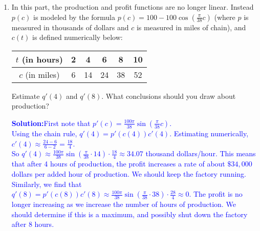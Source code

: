 \documentclass[letterpaper,11pt]{article}
\newif\ifsolutions
\newcommand{\sol}[2]{\begin{minipage}[c][#1]{\linewidth}{\textcolor{blue}{\textbf{Solution:}}\quad \textcolor{blue}{#2}}\end{minipage}}
\newcommand{\sol}[2]{\begin{minipage}[c][#1]{\linewidth}{\vfill}\end{minipage}}
\begin{document}
\begin{enumerate}
\begin{enumerate}
Meaning of $p'(c)$: \ifsolutions \textcolor{blue}{ $4000$ dollars of profit are earned per mile of chain produced.}\fi\\

$q(t) =$ \ifsolutions \textcolor{blue}{ $12000t$ dollars}\fi\\

$q'(t)=$ \ifsolutions \textcolor{blue}{ $12000$ dollars/hour}\fi\\

Meaning of $q'(t)$: \ifsolutions \textcolor{blue}{ $12000$ dollars of profit are earned per hour of production.}\fi\\

How does $q'(t)$ relate to $p'(c)$ and $c'(t)$? 

\sol{.3in}{By the chain rule $q'(t)$ = $p'(c(t))c'(t)$.  So $q'(t) = 4000$ dollars/mile  $\cdot 3$ miles/hour = 12000 dollars/hours.}
\item  In this part, the production and profit functions are no longer linear.  Instead $p(c)$ is modeled by the formula $p(c)=100-100\cos{(\frac{\pi}{38} c)}$ (where $p$ is measured in thousands of dollars and $c$ is measured in miles of chain), and $c(t)$ is defined numerically below:

\medskip
\begin{tabular}{|c|c|c|c|c|c|} \hline
$t$ (in hours) & 2 & 4  & 6  & 8 &10\\ \hline
$c$ (in miles) & 6 & 14 & 24 & 38 & 52\\ \hline
\end{tabular}

\medskip
Estimate $q'(4)$ and $q'(8)$.  What conclusions should you draw about production?

\sol{1.6in}{First note that $p'(c)=\frac{100\pi}{38}\sin{(\frac{\pi}{38}c)}$.\\
Using the chain rule, $q'(4)=p'(c(4))c'(4)$. Estimating numerically, $c'(4) \approx \frac{24-6}{6-2}=\frac{18}{4}$.\\
So $q'(4) \approx \frac{100\pi}{38}\sin{(\frac{\pi}{38}\cdot 14)}\cdot \frac{18}{4}\approx 34.07$ thousand dollars/hour.  This means that after 4 hours of production, the profit increases a rate of about $\$34,000$ dollars per added hour of production.  We should keep the factory running.  Similarly, we find that $q'(8) = p'(c(8))c'(8) \approx \frac{100\pi}{38}\sin{(\frac{\pi}{38}\cdot 38)}\cdot \frac{28}{4}\approx 0$.  The profit is no longer increasing as we increase the number of hours of production.  We should determine if this is a maximum, and possibly shut down the factory after 8 hours.
}
\end{enumerate}

\end{enumerate}
\end{document}
